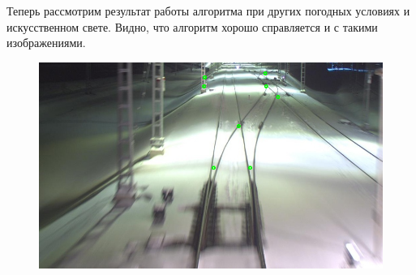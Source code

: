 Теперь рассмотрим результат работы алгоритма при других погодных условиях и искусственном свете. Видно, что алгоритм хорошо справляется и с такими изображениями.
\begin{figure}[!h]
	\centering
	\includegraphics[width=0.7\linewidth]{pictures/screenshot0017}
	\caption{}
	\label{fig:res3}
\end{figure}

